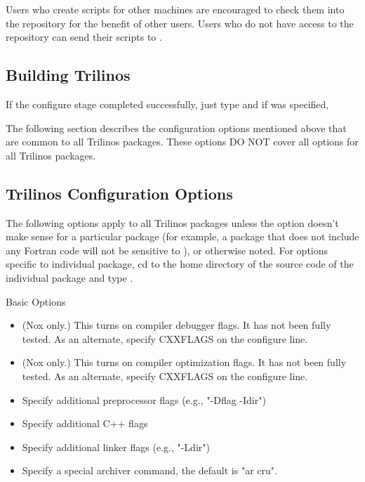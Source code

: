\documentclass[12pt,relax]{TrilinosDevGuide}
\begin{document}
Users who create scripts for other machines are encouraged to check them into 
the repository for the benefit of other users.  Users who do not have access to
the repository can send their scripts to .

\subsection{Building Trilinos}

If the configure stage completed successfully, just type 
 and if 
 was specified, 

The following section describes the configuration options mentioned above that 
are common to all Trilinos packages.  These options DO NOT cover all options 
for all Trilinos packages.

\subsection{Trilinos Configuration Options}
\label{subsect:TrilinosConfigOptions}
The following options apply to all Trilinos packages unless 
the option doesn't make sense for a particular package (for example, a 
package that does not include any Fortran code will not be sensitive to 
), or otherwise noted.  For options specific to 
individual package, cd to the home directory of the source code of the 
individual package and type .

Basic Options

\begin{itemize}
\item {} 

(Nox only.)  This turns on compiler debugger flags. It has 
not been fully tested. As an alternate, specify CXXFLAGS on the 
                 configure line.

\item {}

(Nox only.)  This turns on compiler optimization flags. It 
has not been fully tested. As an alternate, specify CXXFLAGS on the 
                 configure line. 

\item {}

Specify additional preprocessor flags (e.g., "-Dflag -Idir") 

\item {}

Specify additional C++ flags 

\item {}

Specify additional linker flags (e.g., "-Ldir") 

\item {}

Specify a special archiver command, the default is "ar cru". 
\end{itemize}
\end{document}
